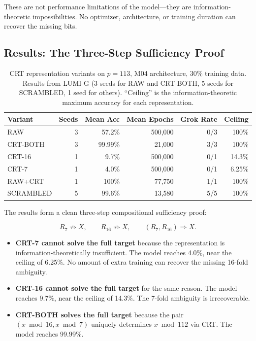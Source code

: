 These are not performance limitations of the model---they are information-theoretic impossibilities. No optimizer, architecture, or training duration can recover the missing bits.


\subsection{Results: The Three-Step Sufficiency Proof}
\label{sec:crt_results}

\begin{table}[t]
\centering
\caption{CRT representation variants on $p = 113$, M04 architecture, 30\% training data. Results from LUMI-G (3 seeds for RAW and CRT-BOTH, 5 seeds for SCRAMBLED, 1 seed for others). ``Ceiling'' is the information-theoretic maximum accuracy for each representation.}
\label{tab:crt_results}
\begin{tabular}{lrrrrr}
\toprule
Variant & Seeds & Mean Acc & Mean Epochs & Grok Rate & Ceiling \\
\midrule
RAW & 3 & 57.2\% & 500,000 & 0/3 & 100\% \\
CRT-BOTH & 3 & 99.99\% & 21,000 & 3/3 & 100\% \\
CRT-16 & 1 & 9.7\% & 500,000 & 0/1 & 14.3\% \\
CRT-7 & 1 & 4.0\% & 500,000 & 0/1 & 6.25\% \\
RAW+CRT & 1 & 100\% & 77,750 & 1/1 & 100\% \\
SCRAMBLED & 5 & 99.6\% & 13,580 & 5/5 & 100\% \\
\bottomrule
\end{tabular}
\end{table}

The results form a clean three-step compositional sufficiency proof:

\begin{equation}
    R_7 \not\Rightarrow X, \qquad R_{16} \not\Rightarrow X, \qquad (R_7, R_{16}) \Rightarrow X.
\end{equation}

\begin{itemize}[leftmargin=*]
    \item \textbf{CRT-7 cannot solve the full target} because the representation is information-theoretically insufficient. The model reaches 4.0\%, near the ceiling of 6.25\%. No amount of extra training can recover the missing 16-fold ambiguity.

    \item \textbf{CRT-16 cannot solve the full target} for the same reason. The model reaches 9.7\%, near the ceiling of 14.3\%. The 7-fold ambiguity is irrecoverable.

    \item \textbf{CRT-BOTH solves the full target} because the pair $(x \bmod 16, x \bmod 7)$ uniquely determines $x \bmod 112$ via CRT. The model reaches 99.99\%.
\end{itemize}


